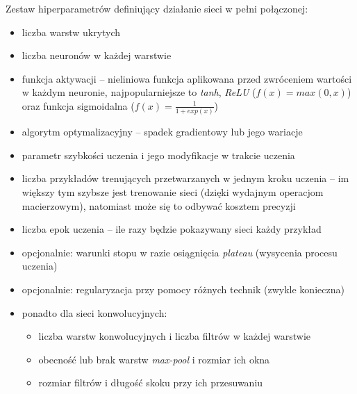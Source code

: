 Zestaw hiperparametrów definiujący działanie sieci w pełni połączonej: 
\begin{itemize}
	\item liczba warstw ukrytych 
	\item liczba neuronów w każdej warstwie
	\item funkcja aktywacji -- nieliniowa funkcja aplikowana przed zwróceniem wartości w każdym neuronie, najpopularniejsze to \textit{tanh}, \textit{ReLU} ($f(x) = max(0,x)$) oraz funkcja sigmoidalna ($f(x) = \frac{1}{1+exp(x)}$)
	\item algorytm optymalizacyjny -- spadek gradientowy lub jego wariacje
	\item parametr szybkości uczenia i jego modyfikacje w trakcie uczenia
	\item liczba przykładów trenujących przetwarzanych w jednym kroku uczenia  -- im większy tym szybsze jest trenowanie sieci (dzięki wydajnym operacjom macierzowym), natomiast może się to odbywać kosztem precyzji
	\item liczba epok uczenia -- ile razy będzie pokazywany sieci każdy przykład
	\item opcjonalnie: warunki stopu  w razie osiągnięcia \textit{plateau} (wysycenia procesu uczenia)
	\item opcjonalnie: regularyzacja przy pomocy różnych technik (zwykle konieczna)
	\item ponadto dla sieci konwolucyjnych: 
	\begin{itemize}
		\item liczba warstw konwolucyjnych i liczba filtrów w każdej warstwie
		\item obecność lub brak warstw \textit{max-pool} i rozmiar ich okna
		\item rozmiar filtrów i długość skoku przy ich przesuwaniu
	\end{itemize}
\end{itemize}

